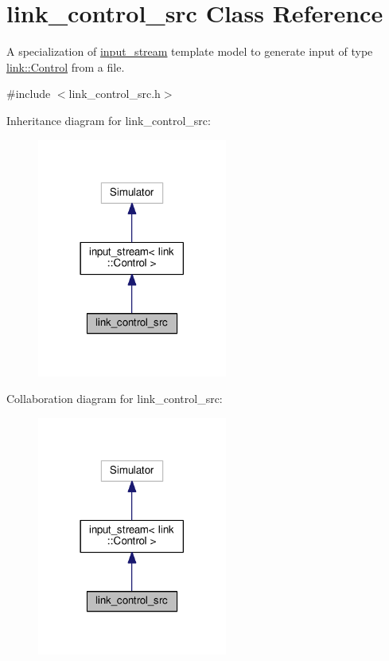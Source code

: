 \hypertarget{classlink__control__src}{}\section{link\+\_\+control\+\_\+src Class Reference}
\label{classlink__control__src}


A specialization of \hyperlink{classinput__stream}{input\+\_\+stream} template model to generate input of type \hyperlink{structlink_1_1Control}{link\+::\+Control} from a file.  




{\ttfamily \#include $<$link\+\_\+control\+\_\+src.\+h$>$}



Inheritance diagram for link\+\_\+control\+\_\+src\+:\nopagebreak
\begin{figure}[H]
\begin{center}
\leavevmode
\includegraphics[width=177pt]{classlink__control__src__inherit__graph}
\end{center}
\end{figure}


Collaboration diagram for link\+\_\+control\+\_\+src\+:\nopagebreak
\begin{figure}[H]
\begin{center}
\leavevmode
\includegraphics[width=177pt]{classlink__control__src__coll__graph}
\end{center}
\end{figure}

